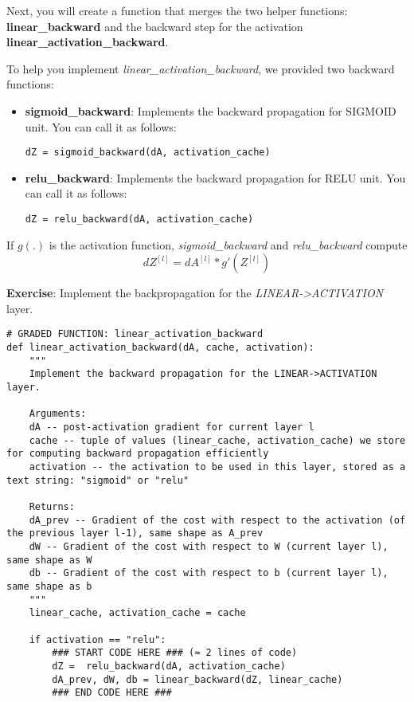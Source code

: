 {Next, you will create a function that merges the two helper functions: {\textbf {linear\_backward}} and the backward step for the activation {\textbf {linear\_activation\_backward}}. 

To help you implement \emph{linear\_activation\_backward}, we provided two backward functions:
\begin{itemize}
\item {\textbf {sigmoid\_backward}}: Implements the backward propagation for SIGMOID unit. You can call it as follows:
\begin{verbatim}
dZ = sigmoid_backward(dA, activation_cache)
\end{verbatim}
\item {\textbf {relu\_backward}}: Implements the backward propagation for RELU unit. You can call it as follows:
\begin{verbatim}
dZ = relu_backward(dA, activation_cache)
\end{verbatim}
\end{itemize}

If $g(.)$ is the activation function, \emph{sigmoid\_backward} and \emph{relu\_backward} compute 
\begin{equation}
dZ^{[l]} = dA^{[l]} * g'(Z^{[l]})
\end{equation}

{\textbf {Exercise}}: Implement the backpropagation for the \emph{LINEAR->ACTIVATION} layer.

\begin{verbatim}
# GRADED FUNCTION: linear_activation_backward
def linear_activation_backward(dA, cache, activation):
    """
    Implement the backward propagation for the LINEAR->ACTIVATION layer.
    
    Arguments:
    dA -- post-activation gradient for current layer l 
    cache -- tuple of values (linear_cache, activation_cache) we store for computing backward propagation efficiently
    activation -- the activation to be used in this layer, stored as a text string: "sigmoid" or "relu"
    
    Returns:
    dA_prev -- Gradient of the cost with respect to the activation (of the previous layer l-1), same shape as A_prev
    dW -- Gradient of the cost with respect to W (current layer l), same shape as W
    db -- Gradient of the cost with respect to b (current layer l), same shape as b
    """
    linear_cache, activation_cache = cache
    
    if activation == "relu":
        ### START CODE HERE ### (≈ 2 lines of code)
        dZ =  relu_backward(dA, activation_cache)
        dA_prev, dW, db = linear_backward(dZ, linear_cache)
        ### END CODE HERE ###
        

\end{verbatim}}
